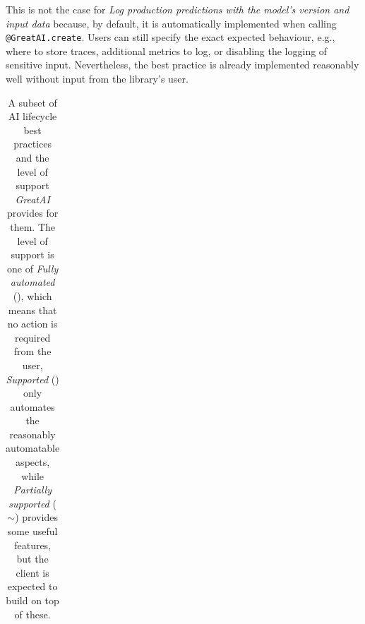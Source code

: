 This is not the case for \textit{Log production predictions with the model's version and input data} because, by default, it is automatically implemented when calling \texttt{@GreatAI.create}. Users can still specify the exact expected behaviour, e.g., where to store traces, additional metrics to log, or disabling the logging of sensitive input. Nevertheless, the best practice is already implemented reasonably well without input from the library's user.

\begin{table}
\centering
\begin{threeparttable}
\caption{A subset of AI lifecycle best practices and the level of support \textit{GreatAI} provides for them. The level of support is one of \textit{Fully automated} (\checkmark\checkmark), which means that no action is required from the user, \textit{Supported} (\checkmark) only automates the reasonably automatable aspects, while \textit{Partially supported} ($\sim$) provides some useful features, but the client is expected to build on top of these.}

\label{table:best-practices-1}
{\renewcommand{\arraystretch}{1.2} %
\begin{tabular}{P{7cm}@{\hskip 0.5cm}l@{\hskip 0cm}c} \hline


\end{tabular}}
\end{threeparttable}
\end{table}
